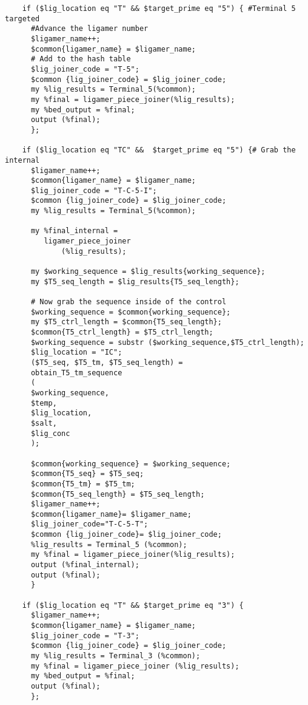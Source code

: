\begin{lstlisting}
    if ($lig_location eq "T" && $target_prime eq "5") { #Terminal 5 targeted
      #Advance the ligamer number
      $ligamer_name++;
      $common{ligamer_name} = $ligamer_name;
      # Add to the hash table
      $lig_joiner_code = "T-5";
      $common {lig_joiner_code} = $lig_joiner_code;
      my %lig_results = Terminal_5(%common);
      my %final = ligamer_piece_joiner(%lig_results);
      my %bed_output = %final;
      output (%final);
      };

    if ($lig_location eq "TC" &&  $target_prime eq "5") {# Grab the internal
      $ligamer_name++;
      $common{ligamer_name} = $ligamer_name;
      $lig_joiner_code = "T-C-5-I";
      $common {lig_joiner_code} = $lig_joiner_code;
      my %lig_results = Terminal_5(%common);

      my %final_internal =
         ligamer_piece_joiner
             (%lig_results);

      my $working_sequence = $lig_results{working_sequence};
      my $T5_seq_length = $lig_results{T5_seq_length};

      # Now grab the sequence inside of the control
      $working_sequence = $common{working_sequence};
      my $T5_ctrl_length = $common{T5_seq_length};
      $common{T5_ctrl_length} = $T5_ctrl_length;
      $working_sequence = substr ($working_sequence,$T5_ctrl_length);
      $lig_location = "IC";
      ($T5_seq, $T5_tm, $T5_seq_length) =
      obtain_T5_tm_sequence
	  (
	  $working_sequence,
	  $temp,
	  $lig_location,
	  $salt,
	  $lig_conc
	  );

      $common{working_sequence} = $working_sequence;
      $common{T5_seq} = $T5_seq;
      $common{T5_tm} = $T5_tm;
      $common{T5_seq_length} = $T5_seq_length;
      $ligamer_name++;
      $common{ligamer_name}= $ligamer_name;
      $lig_joiner_code="T-C-5-T";
      $common {lig_joiner_code}= $lig_joiner_code;
      %lig_results = Terminal_5 (%common);
      my %final = ligamer_piece_joiner(%lig_results);
      output (%final_internal);
      output (%final);
      }

    if ($lig_location eq "T" && $target_prime eq "3") {
      $ligamer_name++;
      $common{ligamer_name} = $ligamer_name;
      $lig_joiner_code = "T-3";
      $common {lig_joiner_code} = $lig_joiner_code;
      my %lig_results = Terminal_3 (%common);
      my %final = ligamer_piece_joiner (%lig_results);
      my %bed_output = %final;
      output (%final);
      };


\end{lstlisting}
